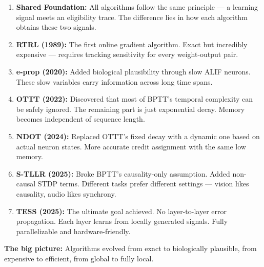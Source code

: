 \documentclass[journal,12pt,onecolumn]{IEEEtran}
\begin{document}
\begin{enumerate}
    \item \textbf{Shared Foundation:} All algorithms follow the same principle — a learning
          signal meets an eligibility trace. The difference lies in how each algorithm
          obtains these two signals.

    \item \textbf{RTRL (1989):} The first online gradient algorithm. Exact but incredibly
          expensive — requires tracking sensitivity for every weight-output pair.

    \item \textbf{e-prop (2020):} Added biological plausibility through slow ALIF neurons.
          These slow variables carry information across long time spans.

    \item \textbf{OTTT (2022):} Discovered that most of BPTT's temporal complexity can be
          safely ignored. The remaining part is just exponential decay. Memory becomes
          independent of sequence length.

    \item \textbf{NDOT (2024):} Replaced OTTT's fixed decay with a dynamic one based on
          actual neuron states. More accurate credit assignment with the same low memory.

    \item \textbf{S-TLLR (2025):} Broke BPTT's causality-only assumption. Added non-causal
          STDP terms. Different tasks prefer different settings — vision likes causality,
          audio likes synchrony.

    \item \textbf{TESS (2025):} The ultimate goal achieved. No layer-to-layer error
          propagation. Each layer learns from locally generated signals. Fully parallelizable
          and hardware-friendly.
\end{enumerate}

\medskip\noindent\textbf{The big picture:} Algorithms evolved from exact to biologically plausible,
from expensive to efficient, from global to fully local.





\end{document}
